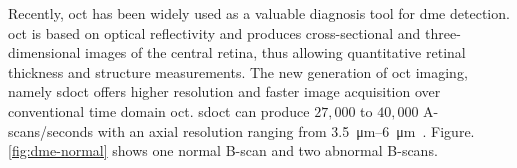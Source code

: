 Recently, \ac{oct} has been widely used as a valuable diagnosis tool for \ac{dme} detection.
\ac{oct} is based on optical reflectivity and produces cross-sectional and three-dimensional images of the central retina, thus allowing quantitative retinal thickness and structure measurements.
The new generation of \ac{oct} imaging, namely \ac{sdoct} offers higher resolution and faster image acquisition over conventional time domain \ac{oct}. \Ac{sdoct} can produce $27,000$ to $40,000$ A-scans/seconds with an axial resolution ranging from \SIrange{3.5}{6}{\micro \metre}~\cite{Chen2005}. 
Figure.\,\ref{fig:dme-normal} shows one normal B-scan and two abnormal B-scans.
\begin{figure}
\begin{center}
\hspace*{\fill}
\hfill

\end{center}
\end{figure}
